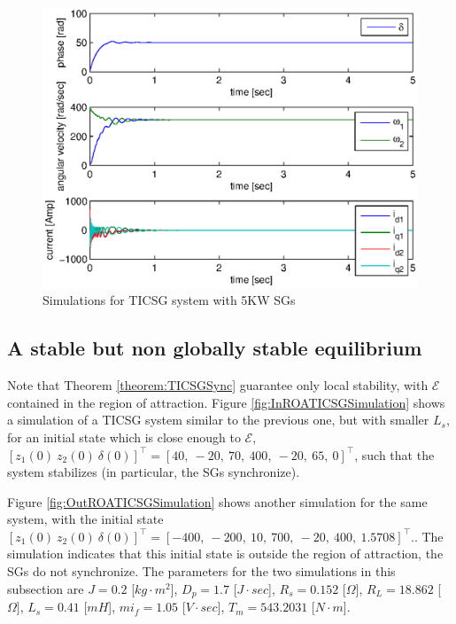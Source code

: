 \documentclass[letterpaper,10pt,conference]{ieeeconf}
\newcommand{\m}      {{\hbox{\hskip 1pt}}}
\newcommand{\Emscr}  {{\mathcal{E}}}
\begin{document}
\begin{figure}[ht] %
\includegraphics[scale=0.65]{5KWTICSGSimulation} \vspace{-8mm}
\caption{Simulations for TICSG system with 5KW SGs} 
\label{fig:5KWSGTICSGSimulation}
\end{figure}

\subsection{A stable but non globally stable equilibrium}

Note that Theorem \ref{theorem:TICSGSync} guarantee only local
stability, with $\Emscr$ contained in the region of attraction. 
Figure \ref{fig:InROATICSGSimulation} shows a simulation of a TICSG 
system similar to the previous one, but with smaller $L_s$, for an
initial state which is close enough to $\Emscr$, $\left[z_1(0)\ z_2(0)
\ \delta(0)\right]^\top=\left[40,\ -20,\ 70,\ 400,\ -20,\ 65,\ 0
\right]^\top$, such that the system stabilizes (in particular, the SGs
synchronize). 

Figure \ref{fig:OutROATICSGSimulation} shows another simulation for
the same system, with the initial state $\left[z_1(0)\ z_2(0) \
\delta(0) \right]^\top=\left[-400,\ -200,\ 10,\ 700,\ -20,\ 400,\
1.5708\right]^\top$.. \m The simu\-lation indicates that this initial
state is outside the region of attraction, the SGs do not
synchronize. The parameters for the two simulations in this subsection
are $J=0.2$ {[}$kg\cdot m^{2}${]}, $D_{p}=1.7$ {[}$J\cdot sec${]}, 
$R_s=0.152$ {[}$\Omega]$, $R_L=18.862$ {[}$\Omega]$, $L_{s}=0.41$ 
{[}$mH${]}, $mi_f=1.05$ {[}$V\cdot sec]$, $T_m=543.2031$ 
{[}$N\cdot m${]}.
\end{document}
